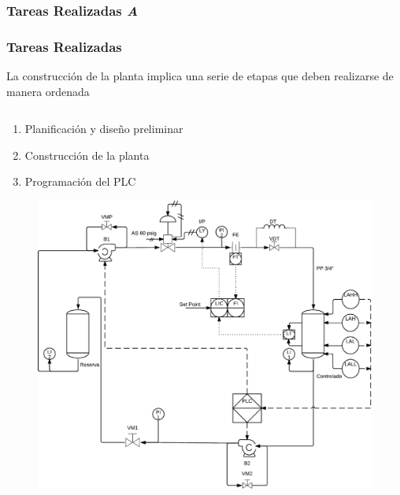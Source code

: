 \begin{frame}
	\ifdebug
	\frametitle{Tareas Realizadas\hfill{\color{red} \emph{A}}}
	\else
	\frametitle{Tareas Realizadas}
	\fi
	
	 \centering
	  La construcción de la planta implica una serie de etapas que deben 
realizarse de manera ordenada
	 
	 \begin{columns}
	  \begin{column}{0.5\textwidth}
	   \begin{enumerate}
	    \item Planificación y diseño preliminar
	    \item Construcción de la planta
	    \item Programación del PLC
	   \end{enumerate}
	    \begin{figure}[h!]
	  \centering
\includegraphics[width=.8\textwidth]
{Sections/2-DisenoEnsamblado/Images/pyid60-1.pdf}
	  \end{figure}
	  \end{column}
	  

\end{columns}
\end{frame}
